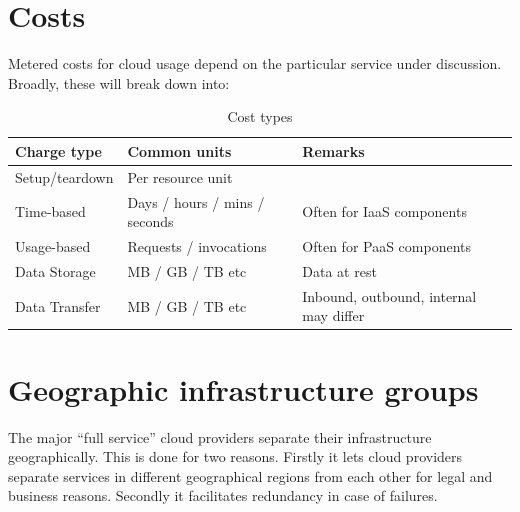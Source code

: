 \documentclass{pgnotes}
\begin{document}
\section{Costs}
\label{sec:costs}

Metered costs for cloud usage depend on the particular service under discussion.
Broadly, these will break down into:

\begin{table}[htbp]
  \centering
  \begin{tabularx}{1.0\linewidth}{l l X}
    \toprule
    \textbf{Charge type} & \textbf{Common units} & \textbf{Remarks} \\
    \midrule
    Setup/teardown & Per resource unit & \\
    Time-based & Days / hours / mins / seconds & Often for IaaS components \\
    Usage-based & Requests / invocations & Often for PaaS components \\
    Data Storage & MB / GB / TB etc & Data at rest \\
    Data Transfer & MB / GB / TB etc & Inbound, outbound, internal may differ \\
    \bottomrule
  \end{tabularx}
  \caption{Cost types}
  \label{tab:cost-types}
\end{table}

\section{Geographic infrastructure groups}
\label{sec:geographic-infrastructure-groups}

The major ``full service'' cloud providers separate their infrastructure geographically.
This is done for two reasons.
Firstly it lets cloud providers separate services in different geographical regions from each other for legal and business reasons.
Secondly it facilitates redundancy in case of failures. 
\end{document}
